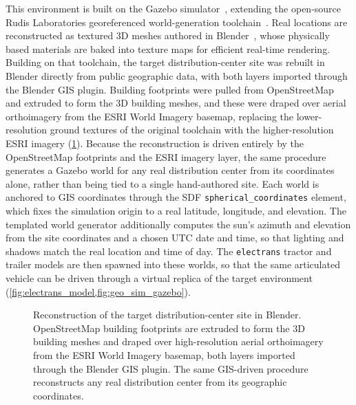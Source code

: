 This environment is built on the Gazebo simulator~\cite{koenig2004gazebo}, extending the open-source Rudis Laboratories georeferenced world-generation toolchain~\cite{perseghetti2021rudisworlds}. Real locations are reconstructed as textured 3D meshes authored in Blender~\cite{blender}, whose physically based materials are baked into texture maps for efficient real-time rendering. Building on that toolchain, the target distribution-center site was rebuilt in Blender directly from public geographic data, with both layers imported through the Blender GIS plugin. Building footprints were pulled from OpenStreetMap~\cite{openstreetmap} and extruded to form the 3D building meshes, and these were draped over aerial orthoimagery from the ESRI World Imagery basemap, replacing the lower-resolution ground textures of the original toolchain with the higher-resolution ESRI imagery (\cref{fig:geo_sim_blender}). Because the reconstruction is driven entirely by the OpenStreetMap footprints and the ESRI imagery layer, the same procedure generates a Gazebo world for any real distribution center from its coordinates alone, rather than being tied to a single hand-authored site. Each world is anchored to GIS coordinates through the SDF \texttt{spherical\_coordinates} element, which fixes the simulation origin to a real latitude, longitude, and elevation. The templated world generator additionally computes the sun's azimuth and elevation from the site coordinates and a chosen UTC date and time, so that lighting and shadows match the real location and time of day. The \texttt{electrans} tractor and trailer models are then spawned into these worlds, so that the same articulated vehicle can be driven through a virtual replica of the target environment (\cref{fig:electrans_model,fig:geo_sim_gazebo}).

\begin{figure}[H]
    \centering
    \caption{Reconstruction of the target distribution-center site in Blender. OpenStreetMap building footprints are extruded to form the 3D building meshes and draped over high-resolution aerial orthoimagery from the ESRI World Imagery basemap, both layers imported through the Blender GIS plugin. The same GIS-driven procedure reconstructs any real distribution center from its geographic coordinates.}
    \label{fig:geo_sim_blender}
\end{figure}

